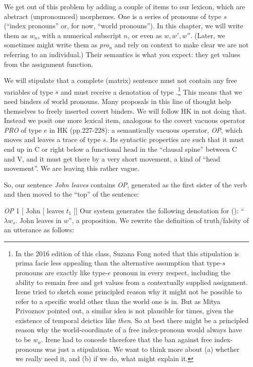 We get out of this problem by adding a couple of items to our lexicon, which are
abstract (unpronounced) morphemes. One is a series of pronouns of type $s$
(``index pronouns'' or, for now, ``world pronouns''). In this chapter, we will
write them as $w_n$, with a numerical subscript $n$, or even as $w, w', w''$.
(Later, we sometimes might write them as \emph{pro}$_n$ and rely on context to
make clear we are not referring to an individual.) Their semantics is what you
expect: they get values from the assignment function.

We will stipulate that a complete (matrix) sentence must not contain any free
variables of type $s$ and must receive a denotation of type
.\footnote{In the 2016 edition of this class, Suzana Fong noted that
  this stipulation is prima facie less appealing than the alternative assumption
  that type-$s$ pronouns are exactly like type-$e$ pronoun in every respect,
  including the ability to remain free and get values from a contextually
  supplied assignment. Irene tried to sketch some principled reason why it might
  not be possible to refer to a specific world other than the world one is in.
  But as Mitya Privoznov pointed out, a similar idea is not plausible for times,
  given the existence of temporal deictics like \emph{then}. So at best there
  might be a principled reason why the world-coordinate of a free index-pronoun
  would always have to be $w_u$. Irene had to concede therefore that the ban
  against free index-pronouns was just a stipulation. We want to think more
  about (a) whether we really need it, and (b) if we do, what might explain it.}
This means that we need binders of world pronouns. Many proposals in this line
of thought help themselves to freely inserted covert binders. We will follow
H\amp K in not doing that. Instead we posit one more lexical item, analogous to
the covert vacuous operator \emph{PRO} of type $e$ in H\amp K (pp.227-228): a
semantically vacuous operator, \emph{OP}, which moves and leaves a trace of type
$s$. Its syntactic properties are such that it must end up in C or right below a
functional head in the ``clausal spine'' between C and V, and it must get there
by a very short movement, a kind of ``head movement''. We are leaving this
rather vague.

So, our sentence \emph{John leaves} contains \emph{OP}, generated as the first
sister of the verb and then moved to the ``top'' of the sentence:

\ex \emph{OP} 1 [ John [ leaves $t_1$ ]] \xe
%
Our system generates the following denotation for (\lastx): ``$\lambda w_s.$
John leaves in $w$'', a proposition. We rewrite the definition of truth/falsity
of an utterance as follows:


